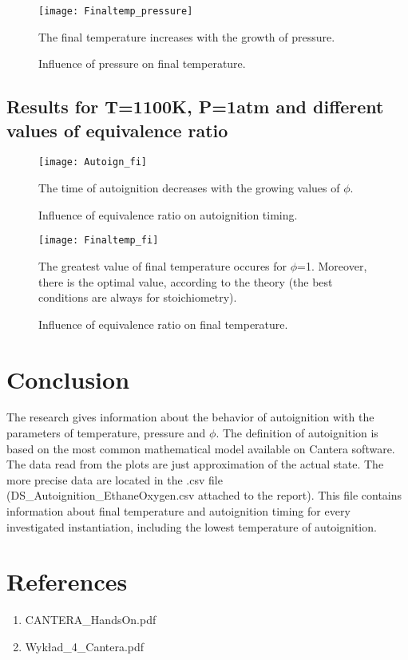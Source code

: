 \documentclass[11pt]{article}
\begin{document}
\begin{figure} [H]
	\begin{center}
    	\texttt{[image: Finaltemp\_pressure]}
        \caption{Influence of pressure on final temperature.}
    \end{center}
\normalsize
{The final temperature increases with the growth of pressure. }
\end{figure}

\subsection{Results for T=1100K, P=1atm and different values of equivalence ratio}
\begin{figure} [H]
	\begin{center}
    	\texttt{[image: Autoign\_fi]}
        \caption{Influence of equivalence ratio on autoignition timing.}
    \end{center}
\normalsize
{The time of autoignition decreases with the growing values of $\phi$. }
\end{figure}

\begin{figure} [H]
	\begin{center}
    	\texttt{[image: Finaltemp\_fi]}
        \caption{Influence of equivalence ratio on final temperature.}
    \end{center}
\normalsize
{The greatest value of final temperature occures for $\phi$=1. Moreover, there is the optimal value, according to the theory (the best conditions are always for stoichiometry).}
\end{figure}

\section{Conclusion}
The research gives information about the behavior of autoignition with the parameters of temperature, pressure and $\phi$. The definition of autoignition is based on the most common mathematical model available on Cantera software. The data read from the plots are just approximation of the actual state. The more precise data are located in the .csv file (DS\_Autoignition\_EthaneOxygen.csv attached to the report). This file contains information about final temperature and autoignition timing for every investigated instantiation, including the lowest temperature of autoignition.

\newpage

\section{References}
\begin{enumerate}
	\item{CANTERA\_HandsOn.pdf}
    \item{Wykład\_4\_Cantera.pdf}
\end{enumerate}
\end{document}
